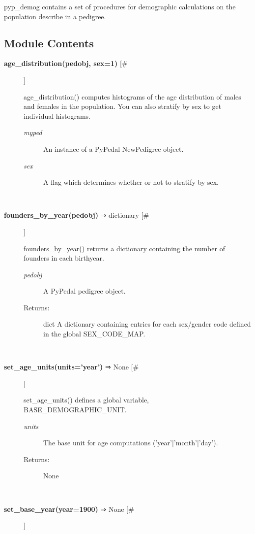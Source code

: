 

 pyp\_demog contains a set of procedures for demographic calculations on the population describe in a pedigree.
\subsection*{Module Contents}
\begin{description}
\item[\textbf{age\_distribution(pedobj, sex=1)}
 [\#]]

 age\_distribution() computes histograms of the age distribution of males and females in the population. You can also stratify by sex to get individual histograms.
\begin{description}
\item[\emph{myped}
] An instance of a PyPedal NewPedigree object.
\item[\emph{sex}
] A flag which determines whether or not to stratify by sex.

\end{description}
\\ 

\item[\textbf{founders\_by\_year(pedobj)}
 ⇒ dictionary [\#]]

 founders\_by\_year() returns a dictionary containing the number of founders in each birthyear.
\begin{description}
\item[\emph{pedobj}
] A PyPedal pedigree object.
\item[Returns:] dict A dictionary containing entries for each sex/gender code defined in the global SEX\_CODE\_MAP.

\end{description}
\\ 

\item[\textbf{set\_age\_units(units='year')}
 ⇒ None [\#]]

 set\_age\_units() defines a global variable, BASE\_DEMOGRAPHIC\_UNIT.
\begin{description}
\item[\emph{units}
] The base unit for age computations ('year'|'month'|'day').
\item[Returns:] None

\end{description}
\\ 

\item[\textbf{set\_base\_year(year=1900)}
 ⇒ None [\#]]


\end{description}
